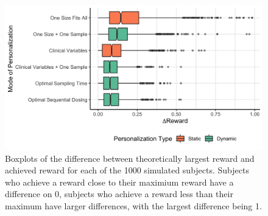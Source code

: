 \begin{figure}
	\centering
	\includegraphics[width=1\linewidth]{figures/models_of_personalization_differences}
	\caption{Boxplots of the difference between theoretically largest reward and achieved reward for each of the 1000 simulated subjects. Subjects who achieve a reward close to their maximium reward have a difference on 0, subjects who achieve a reward less than their maximum have larger differences, with the largest difference being 1.}
	\label{fig:modelsofpersonalizationdifferences}
\end{figure}
